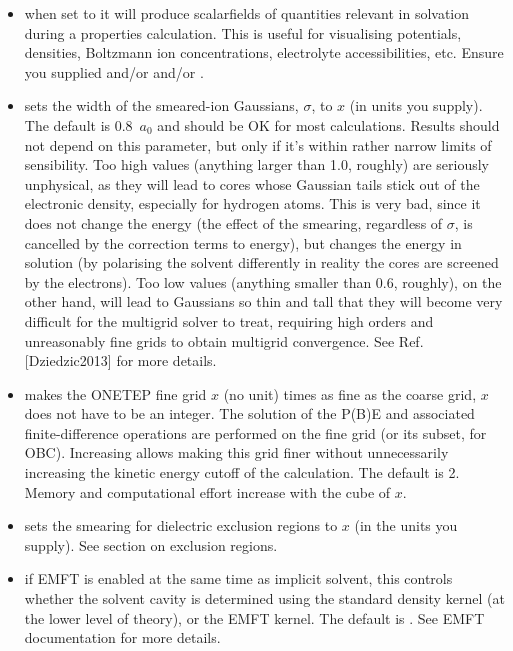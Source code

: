 \documentclass[letterpaper,10pt,english]{sphinxmanual}
\begin{document}
\begin{itemize}
\item {} 
 when set to  it will produce
scalarfields of quantities relevant in solvation during a properties
calculation. This is useful for visualising potentials, densities,
Boltzmann ion concentrations, electrolyte accessibilities, etc.
Ensure you supplied  and/or  and/or
.

\item {} 
 sets the width of the smeared-ion
Gaussians, \(\sigma\), to \(x\) (in units you supply). The
default is 0.8 \(a_0\) and should be OK for most calculations.
Results should not depend on this parameter, but only if it’s within
rather narrow limits of sensibility. Too high values (anything larger
than 1.0, roughly) are seriously unphysical, as they will lead to
cores whose Gaussian tails stick out of the electronic density,
especially for hydrogen atoms. This is very bad, since it does not
change the energy  (the effect of the smearing, regardless
of \(\sigma\), is cancelled by the correction terms to energy),
but changes the energy in solution (by polarising the solvent
differently in reality the cores are screened by the electrons). Too
low values (anything smaller than 0.6, roughly), on the other hand,
will lead to Gaussians so thin and tall that they will become very
difficult for the multigrid solver to treat, requiring high orders
and unreasonably fine grids to obtain multigrid convergence. See
Ref. {[}Dziedzic2013{]} for more details.

\item {} 
 makes the ONETEP fine grid \(x\) (no unit)
times as fine as the coarse grid, \(x\) does not have to be an
integer. The solution of the P(B)E and associated finite-difference
operations are performed on the fine grid (or its subset, for OBC).
Increasing  allows making this grid finer without
unnecessarily increasing the kinetic energy cutoff of the
calculation. The default is 2. Memory and computational effort
increase with the cube of \(x\).

\item {} 
 sets the smearing for dielectric
exclusion regions to \(x\) (in the units you supply). See
section on exclusion regions.

\item {} 
 if EMFT is enabled at the same time as
implicit solvent, this controls whether the solvent cavity is
determined using the standard density kernel (at the lower level of
theory), or the EMFT kernel. The default is . See EMFT
documentation for more details.

\end{itemize}
\end{document}
